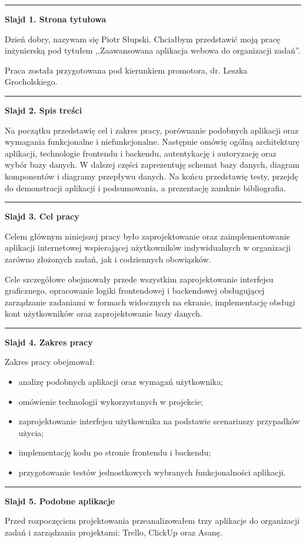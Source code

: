 \documentclass[12pt,a4paper]{article}
\newif\iffirstslide
\newcommand{\Slide}[2]{%
  \iffirstslide
    \global\firstslidefalse
  \else
    \par\vspace{1.5\baselineskip}%
    \noindent\rule{\textwidth}{0.8pt}%
    \par\vspace{1.5\baselineskip}%
  \fi
  {\LARGE\bfseries Slajd #1. #2\par}%
  \vspace{2\baselineskip}%
}
\begin{document}
\Slide{1}{Strona tytułowa}

Dzień dobry, nazywam się Piotr Słupski. Chciałbym przedstawić moją pracę inżynierską pod tytułem ,,Zaawansowana aplikacja webowa do organizacji zadań''.

Praca została przygotowana pod kierunkiem promotora, dr. Leszka Grocholskiego.

\Slide{2}{Spis treści}

Na początku przedstawię cel i zakres pracy, porównanie podobnych aplikacji oraz wymagania funkcjonalne i niefunkcjonalne. Następnie omówię ogólną architekturę aplikacji, technologie frontendu i backendu, autentykację i autoryzację oraz wybór bazy danych. W dalszej części zaprezentuję schemat bazy danych, diagram komponentów i diagramy przepływu danych. Na końcu przedstawię testy, przejdę do demonstracji aplikacji i podsumowania, a prezentację zamknie bibliografia.

\Slide{3}{Cel pracy}

Celem głównym niniejszej pracy było zaprojektowanie oraz zaimplementowanie aplikacji internetowej wspierającej użytkowników indywidualnych w organizacji zarówno złożonych zadań, jak i codziennych obowiązków.

Cele szczegółowe obejmowały przede wszystkim zaprojektowanie interfejsu graficznego, opracowanie logiki frontendowej i backendowej obsługującej zarządzanie zadaniami w formach widocznych na ekranie, implementację obsługi kont użytkowników oraz zaprojektowanie bazy danych.

\Slide{4}{Zakres pracy}

Zakres pracy obejmował:

\begin{itemize}
  \item analizę podobnych aplikacji oraz wymagań użytkownika;
  \item omówienie technologii wykorzystanych w projekcie;
  \item zaprojektowanie interfejsu użytkownika na podstawie scenariuszy przypadków użycia;
  \item implementację kodu po stronie frontendu i backendu;
  \item przygotowanie testów jednostkowych wybranych funkcjonalności aplikacji.
\end{itemize}

\clearpage
\Slide{5}{Podobne aplikacje}

Przed rozpoczęciem projektowania przeanalizowałem trzy aplikacje do organizacji zadań i zarządzania projektami: Trello, ClickUp oraz Asanę.
\end{document}
